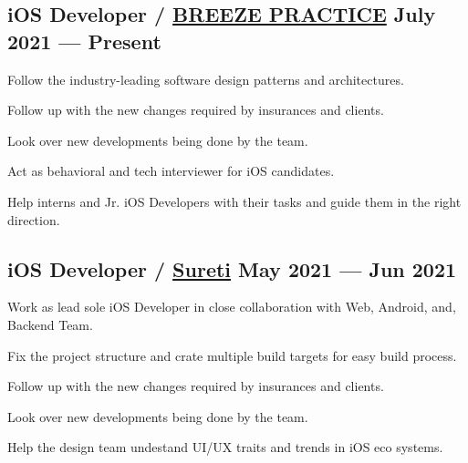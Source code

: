 \documentclass[letter,10pt]{article}
\begin{document}
\subsection{{iOS Developer / \href{https://www.carecloud.com/breeze/}{BREEZE PRACTICE} \hfill July 2021 --- Present}}
\begin{zitemize}
\item Follow the industry-leading software design patterns and architectures.
\item Follow up with the new changes required by insurances and clients.
\item Look over new developments being done by the team.
\item Act as behavioral and tech interviewer for iOS candidates.
\item Help interns and Jr. iOS Developers with their tasks and guide them in the right direction.
\end{zitemize}

\subsection{{iOS Developer / \href{https://sureti.com/}{Sureti} \hfill May 2021 --- Jun 2021}}
\begin{zitemize}
\item Work as lead sole iOS Developer in close collaboration with Web, Android, and, Backend Team.
\item Fix the project structure and crate multiple build targets for easy build process.
\item Follow up with the new changes required by insurances and clients.
\item Look over new developments being done by the team.
\item Help the design team undestand UI/UX traits and trends in iOS eco systems.
\end{zitemize}

\end{document}
